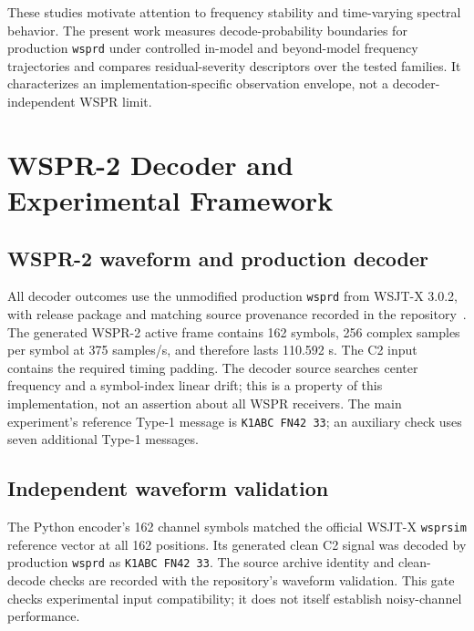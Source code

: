 \documentclass{ieeeaccess}
\begin{document}
These studies motivate attention to frequency stability and time-varying spectral behavior. The present work measures decode-probability boundaries for production \texttt{wsprd} under controlled in-model and beyond-model frequency trajectories and compares residual-severity descriptors over the tested families. It characterizes an implementation-specific observation envelope, not a decoder-independent WSPR limit.

\section{WSPR-2 Decoder and Experimental Framework}
\subsection{WSPR-2 waveform and production decoder}
All decoder outcomes use the unmodified production \texttt{wsprd} from WSJT-X 3.0.2, with release package and matching source provenance recorded in the repository~\cite{wsjtx302}. The generated WSPR-2 active frame contains 162 symbols, 256 complex samples per symbol at 375 samples/s, and therefore lasts 110.592 s. The C2 input contains the required timing padding. The decoder source searches center frequency and a symbol-index linear drift; this is a property of this implementation, not an assertion about all WSPR receivers. The main experiment's reference Type-1 message is \texttt{K1ABC FN42 33}; an auxiliary check uses seven additional Type-1 messages.

\subsection{Independent waveform validation}
The Python encoder's 162 channel symbols matched the official WSJT-X \texttt{wsprsim} reference vector at all 162 positions. Its generated clean C2 signal was decoded by production \texttt{wsprd} as \texttt{K1ABC FN42 33}. The source archive identity and clean-decode checks are recorded with the repository's waveform validation. This gate checks experimental input compatibility; it does not itself establish noisy-channel performance.
\end{document}
